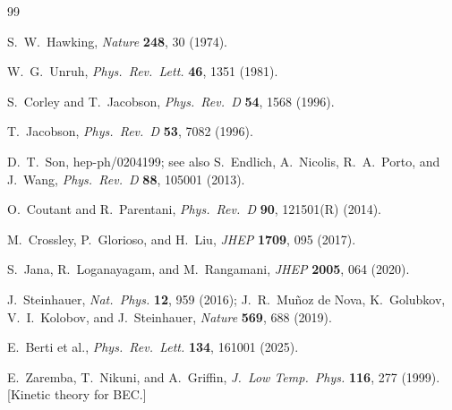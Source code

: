 \documentclass[aps,prl,twocolumn,superscriptaddress,nofootinbib,amsmath,amssymb]{revtex4-2}
\begin{document}
\begin{thebibliography}{99}

 S.~W.~Hawking, \textit{Nature} \textbf{248}, 30 (1974).

 W.~G.~Unruh, \textit{Phys.\ Rev.\ Lett.} \textbf{46}, 1351 (1981).

 S.~Corley and T.~Jacobson, \textit{Phys.\ Rev.\ D} \textbf{54}, 1568 (1996).

 T.~Jacobson, \textit{Phys.\ Rev.\ D} \textbf{53}, 7082 (1996).

 D.~T.~Son, hep-ph/0204199; see also S.~Endlich, A.~Nicolis, R.~A.~Porto, and J.~Wang, \textit{Phys.\ Rev.\ D} \textbf{88}, 105001 (2013).

 O.~Coutant and R.~Parentani, \textit{Phys.\ Rev.\ D} \textbf{90}, 121501(R) (2014).

 M.~Crossley, P.~Glorioso, and H.~Liu, \textit{JHEP} \textbf{1709}, 095 (2017).

 S.~Jana, R.~Loganayagam, and M.~Rangamani, \textit{JHEP} \textbf{2005}, 064 (2020).

 J.~Steinhauer, \textit{Nat.\ Phys.} \textbf{12}, 959 (2016); J.~R.~Mu\~noz de Nova, K.~Golubkov, V.~I.~Kolobov, and J.~Steinhauer, \textit{Nature} \textbf{569}, 688 (2019).

 E.~Berti et al., \textit{Phys.\ Rev.\ Lett.} \textbf{134}, 161001 (2025).

 E.~Zaremba, T.~Nikuni, and A.~Griffin, \textit{J.\ Low Temp.\ Phys.} \textbf{116}, 277 (1999). [Kinetic theory for BEC.]

\end{thebibliography}
\end{document}
